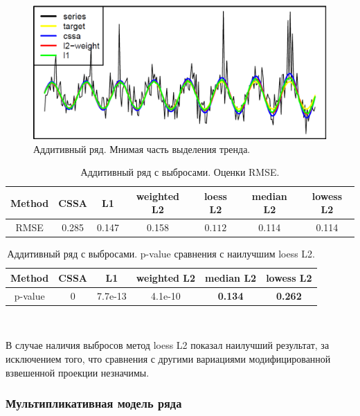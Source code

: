 \documentclass[specialist,
               substylefile = spbu.rtx,
               subf,href,colorlinks=true, 12pt]{disser}
\begin{document}
\begin{figure}[H]
	\begin{center}
		\includegraphics[width=0.67\linewidth]{img/analys_1_Im.png}
	\end{center}
	\caption{Аддитивный ряд. Мнимая часть выделения тренда.}
	\label{analys_Im_1}
\end{figure}

\begin{table}[H]
	\begin{center}
		\caption{Аддитивный ряд с выбросами. Оценки RMSE.}
		\label{tab2}
		\begin{tabular}{|c|c|c|c|c|c|c|}
			\hline
			Method 	& CSSA & L1 & weighted L2 & loess L2 & median L2 & lowess L2 \\
			\hline
			RMSE & 0.285  & 0.147  & 0.158 & $\mathbf{0.112}$ & 0.114 & 0.114\\
			\hline
		\end{tabular}
	\end{center}
\end{table}

\begin{table}[H]
	\caption{Аддитивный ряд с выбросами. p-value сравнения с наилучшим loess L2.}
	\label{tab: pval2}
	\begin{center}
		\begin{tabular}{|c|c|c|c|c|c|}
			\hline
			Method & CSSA	& L1 & weighted L2 & median L2 & lowess L2  \\
			\hline
			p-value & 0  & 7.7e-13 &   4.1e-10  &  \textbf{0.134} & \textbf{0.262}  \\
			\hline
		\end{tabular} \\
	\end{center}
\end{table}

В случае наличия выбросов метод loess L2 показал наилучший результат, за исключением того, что сравнения с другими вариациями модифицированной взвешенной проекции незначимы.


\subsubsection{Мультипликативная модель ряда}
\end{document}
